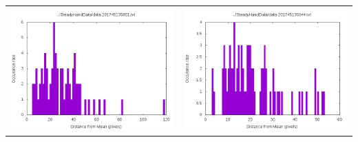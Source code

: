\documentclass[10pt,letterpaper]{article}
\begin{document}
\begin{table}
\begin{tabular}{cc}
\includegraphics[scale=.5]{graph-data-201745135851.png} & \includegraphics[scale=.5]{graph-data-201745135944.png}\\
\end{tabular}
\end{table}
\end{document}
